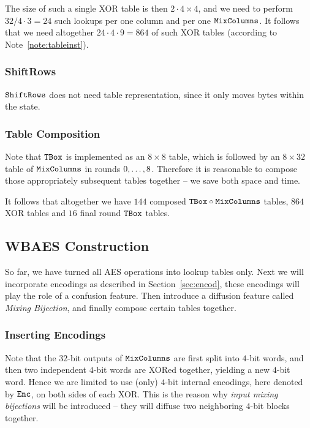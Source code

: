 	The size of such a single XOR table is then $2\cdot 4\times 4$, and we need to perform $32/4\cdot 3=24$ such lookups per one column and per one $\texttt{MixColumns}$. It follows that we need altogether $24\cdot 4\cdot 9 = 864$ of such XOR tables (according to Note~\ref{note:tableinst}).

\subsubsection{ShiftRows}
	
	$\texttt{ShiftRows}$ does not need table representation, since it only moves bytes within the state.

\subsubsection{Table Composition}
	
	Note that $\texttt{TBox}$ is implemented as an $8\times 8$ table, which is followed by an $8\times 32$ table of $\texttt{MixColumns}$ in rounds $0 , \ldots , 8$. Therefore it is reasonable to compose those appropriately subsequent tables together -- we save both space and time.
	
	It follows that altogether we have $144$ composed $\texttt{TBox}\circ\texttt{MixColumns}$ tables, $864$ XOR tables and $16$ final round $\texttt{TBox}$ tables.



\subsection{WBAES Construction}
\label{sec:constrwbaes}

So far, we have turned all AES operations into lookup tables only. Next we will incorporate encodings as described in Section~\ref{sec:encod}, these encodings will play the role of a confusion feature. Then introduce a diffusion feature called {\em Mixing Bijection}, and finally compose certain tables together.

\subsubsection{Inserting Encodings}
	
	Note that the $32$-bit outputs of $\texttt{MixColumns}$ are first split into $4$-bit words, and then two independent $4$-bit words are XORed together, yielding a new $4$-bit word. Hence we are limited to use (only) $4$-bit internal encodings, here denoted by $\texttt{Enc}$, on both sides of each XOR. This is the reason why {\em input mixing bijections} will be introduced -- they will diffuse two neighboring $4$-bit blocks together.


